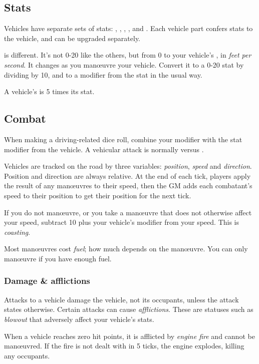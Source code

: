 \documentclass[10pt, a4paper, twocolumn]{article}
\begin{document}
\subsection{Stats}
Vehicles have separate sets of stats: , , , ,  and . Each vehicle part confers stats to the vehicle, and can be upgraded separately.

 is different. It's not 0-20 like the others, but from 0 to your vehicle's , in \emph{feet per second}. It changes as you man\oe{}uvre your vehicle. Convert it to a 0-20 stat by dividing by 10, and to a modifier from the stat in the usual way.

A vehicle's  is 5 times its  stat.

\subsection{Combat}
When making a driving-related dice roll, combine your  modifier with the stat modifier from the vehicle. A vehicular attack is normally  versus .

Vehicles are tracked on the road by three variables: \emph{position}, \emph{speed} and \emph{direction}. Position and direction are always relative. At the end of each tick, players apply the result of any man\oe{}uvres to their speed, then the GM adds each combatant's speed to their position to get their position for the next tick.

If you do not man\oe{}uvre, or you take a man\oe{}uvre that does not otherwise affect your speed, subtract 10 plus your vehicle's  modifier from your speed. This is \emph{coasting}.

Most man\oe{}uvres cost \emph{fuel}; how much depends on the man\oe{}uvre. You can only man\oe{}uvre if you have enough fuel.

\subsubsection{Damage \& afflictions}
Attacks to a vehicle damage the vehicle, not its occupants, unless the attack states otherwise. Certain attacks can cause \emph{afflictions}. These are statuses such as \emph{blowout} that adversely affect your vehicle's stats.

When a vehicle reaches zero hit points, it is afflicted by \emph{engine fire} and cannot be man\oe{}uvred. If the fire is not dealt with in 5 ticks, the engine explodes, killing any occupants.
\end{document}

